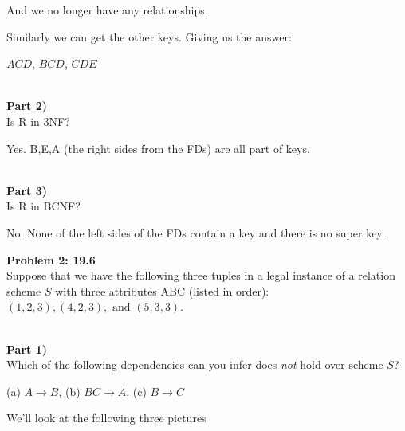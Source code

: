 \documentclass[12pt,letter]{article}
\newcommand{\problem}[1]{\vspace{3mm}\Large\textbf{{Problem
{#1}\vspace{3mm}}}\normalsize\\}
\newcommand{\ppart}[1]{\vspace{2mm}\large\textbf{\\Part
{#1})\vspace{2mm}}\normalsize\\}
\begin{document}
And we no longer have any relationships.

Similarly we can get the other keys. Giving us the answer:

$ACD$, $BCD$, $CDE$

\ppart{2}
Is R in 3NF?

Yes. B,E,A (the right sides from the FDs) are all part of keys.

\ppart{3}
Is R in BCNF?

No. None of the left sides of the FDs contain a key and there is no super key.

\problem{2: 19.6}
Suppose that we have the following three tuples in a legal instance of a
relation scheme $S$ with three attributes ABC (listed in order): $(1,2,3),
(4,2,3), \text{ and } (5,3,3)$.

\begin{figure}[ht!]
    \center
\end{figure}
\FloatBarrier
\ppart{1}
Which of the following dependencies can you infer does \textit{not} hold over
scheme $S$?

(a) $A \rightarrow B$, (b) $BC \rightarrow A$, (c) $B \rightarrow C$

We'll look at the following three pictures
\begin{figure}[ht!]
    \center
\end{figure}
\end{document}
